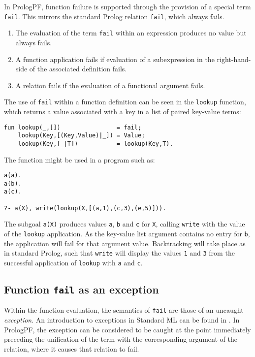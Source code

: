 In PrologPF, function failure is supported through the provision of a
special term \texttt{fail}.
This mirrors the standard Prolog relation \texttt{fail}, which
always fails.
\begin{enumerate}
\item{The evaluation of the term \texttt{fail} within an expression
  produces no value but always fails.}
\item{A function application fails if evaluation of a subexpression
  in the right-hand-side of the associated definition fails.}
\item{A relation fails if the evaluation of a functional argument
  fails.}
\end{enumerate}
The use of \texttt{fail} within a function definition can be seen
in the \texttt{lookup} function, which returns a value associated
with a key in a list of paired key-value terms:
\begin{verbatim}
fun lookup(_,[])                = fail;
    lookup(Key,[(Key,Value)|_]) = Value;
    lookup(Key,[_|T])           = lookup(Key,T).
\end{verbatim}
The function might be used in a program such as:
\begin{verbatim}
a(a).
a(b).
a(c).

?- a(X), write(lookup(X,[(a,1),(c,3),(e,5)])).
\end{verbatim}
The subgoal \texttt{a(X)} produces values \texttt{a},
\texttt{b} and \texttt{c} for \texttt{X}, calling \texttt{write}
with the value of the \texttt{lookup} application.  As the
key-value list argument contains no entry for \texttt{b}, the
application will fail for that argument value.  Backtracking will
take place as in standard Prolog, such that \texttt{write} will
display the values \texttt{1} and \texttt{3} from the successful
application of \texttt{lookup} with \texttt{a} and \texttt{c}.

\subsection{Function \texttt{fail} as an exception}

Within the function evaluation, the semantics of \texttt{fail} are
those of an uncaught \textit{exception}.  An introduction to exceptions in
Standard ML can be found in \cite{Pau91}.
In PrologPF, the exception can be considered to be caught at the point
immediately preceding the unification of the term with the
corresponding argument of the relation, where it causes that relation
to fail.

